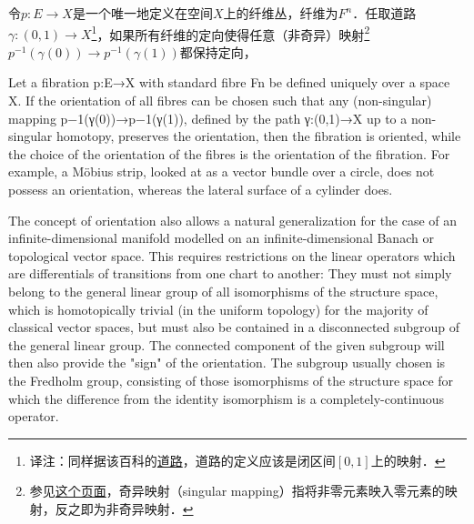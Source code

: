 



令$p: E\to X$是一个唯一地定义在空间$X$上的纤维丛，纤维为$F^n$．任取道路$\gamma: (0, 1)\to X$\footnote{译注：同样据该百科的\href{https://encyclopediaofmath.org/wiki/Path}{道路}，道路的定义应该是闭区间$[0, 1]$上的映射．}，如果所有纤维的定向使得任意（非奇异）映射\footnote{参见\href{https://solitaryroad.com/c218.html}{这个页面}，奇异映射（singular mapping）指将非零元素映入零元素的映射，反之即为非奇异映射．}$p^{-1}(\gamma(0))\to p^{-1}(\gamma(1))$都保持定向，




Let a fibration p:E→X with standard fibre Fn be defined uniquely over a space X. If the orientation of all fibres can be chosen such that any (non-singular) mapping p−1(γ(0))→p−1(γ(1)), defined by the path γ:(0,1)→X up to a non-singular homotopy, preserves the orientation, then the fibration is oriented, while the choice of the orientation of the fibres is the orientation of the fibration. For example, a Möbius strip, looked at as a vector bundle over a circle, does not possess an orientation, whereas the lateral surface of a cylinder does.

The concept of orientation also allows a natural generalization for the case of an infinite-dimensional manifold modelled on an infinite-dimensional Banach or topological vector space. This requires restrictions on the linear operators which are differentials of transitions from one chart to another: They must not simply belong to the general linear group of all isomorphisms of the structure space, which is homotopically trivial (in the uniform topology) for the majority of classical vector spaces, but must also be contained in a disconnected subgroup of the general linear group. The connected component of the given subgroup will then also provide the "sign" of the orientation. The subgroup usually chosen is the Fredholm group, consisting of those isomorphisms of the structure space for which the difference from the identity isomorphism is a completely-continuous operator.


















